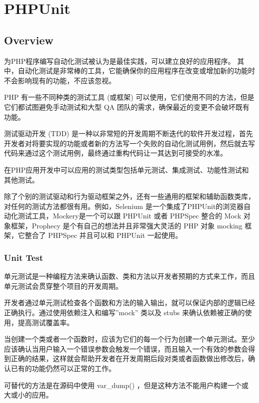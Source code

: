 \part{PHPUnit}


\chapter{Overview}

为PHP程序编写自动化测试被认为是最佳实践，可以建立良好的应用程序。 其中，自动化测试是非常棒的工具，它能确保你的应用程序在改变或增加新的功能时不会影响现有的功能，不应该忽视。


PHP 有一些不同种类的测试工具 (或框架) 可以使用，它们使用不同的方法，但是它们都试图避免手动测试和大型 QA 团队的需求，确保最近的变更不会破坏既有功能。

测试驱动开发 (TDD) 是一种以非常短的开发周期不断迭代的软件开发过程，首先开发者对将要实现的功能或者新的方法写一个失败的自动化测试用例，然后就去写代码来通过这个测试用例，最终通过重构代码让一其达到可接受的水准。

在PHP应用开发中可以应用的测试类型包括单元测试、集成测试、功能性测试和其他测试。

除了个别的测试驱动和行为驱动框架之外，还有一些通用的框架和辅助函数类库，对任何的测试方法都很有用。例如，Selenium 是一个集成了PHPUnit的浏览器自动化测试工具，Mockery是一个可以跟 PHPUnit 或者 PHPSpec 整合的 Mock 对象框架，Prophecy 是个有自己的想法并且非常强大灵活的 PHP 对象 mocking 框架，它整合了 PHPSpec 并且可以和 PHPUnit 一起使用。



\section{Unit Test}


单元测试是一种编程方法来确认函数、类和方法以开发者预期的方式来工作，而且单元测试会贯穿整个项目的开发周期。

开发者通过单元测试检查各个函数和方法的输入输出，就可以保证内部的逻辑已经正确执行。通过使用依赖注入和编写”mock” 类以及 stubs 来确认依赖被正确的使用，提高测试覆盖率。

当创建一个类或者一个函数时，应该为它们的每一个行为创建一个单元测试。至少应该确认当用户输入一个错误参数会触发一个错误，而且输入一个有效的参数会得到正确的结果，这样就会帮助开发者在开发周期后段对类或者函数做出修改后，确认已有的功能仍然可以正常的工作。

可替代的方法是在源码中使用 var\_dump() ，但是这种方法不能用户构建一个或大或小的应用。

